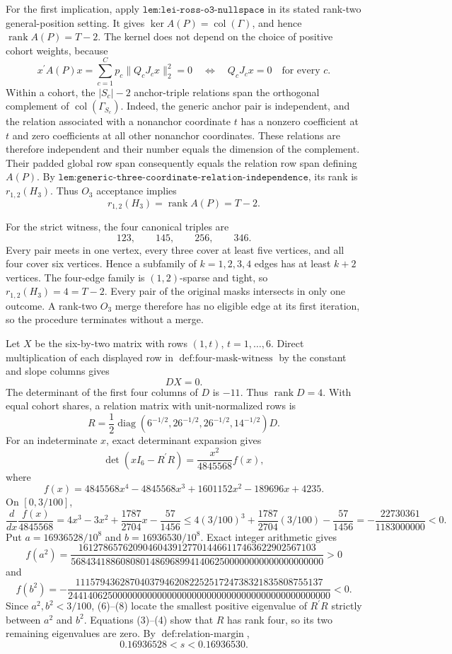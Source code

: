 For the first implication, apply \(\texttt{lem:lei-ross-o3-nullspace}\) in its stated rank-two general-position setting. It gives \(\ker A(P)=\operatorname{col}(\Gamma)\), and hence \(\operatorname{rank}A(P)=T-2\). The kernel does not depend on the choice of positive cohort weights, because
\[
x^{\prime}A(P)x
=\sum_{c=1}^Cp_c\|Q_cJ_cx\|_2^2=0
\quad\Longleftrightarrow\quad
Q_cJ_cx=0\quad\text{for every }c.
\tag{1}
\]
Within a cohort, the \(|S_c|-2\) anchor-triple relations span the orthogonal complement of \(\operatorname{col}(\Gamma_{S_c})\). Indeed, the generic anchor pair is independent, and the relation associated with a nonanchor coordinate \(t\) has a nonzero coefficient at \(t\) and zero coefficients at all other nonanchor coordinates. These relations are therefore independent and their number equals the dimension of the complement. Their padded global row span consequently equals the relation row span defining \(A(P)\). By \(\texttt{lem:generic-three-coordinate-relation-independence}\), its rank is \(r_{1,2}(H_3)\). Thus \(O_3\) acceptance implies
\[
r_{1,2}(H_3)=\operatorname{rank}A(P)=T-2.
\tag{2}
\]

For the strict witness, the four canonical triples are
\[
123,\qquad145,\qquad256,\qquad346.
\]
Every pair meets in one vertex, every three cover at least five vertices, and all four cover six vertices. Hence a subfamily of \(k=1,2,3,4\) edges has at least \(k+2\) vertices. The four-edge family is \((1,2)\)-sparse and tight, so \(r_{1,2}(H_3)=4=T-2\). Every pair of the original masks intersects in only one outcome. A rank-two \(O_3\) merge therefore has no eligible edge at its first iteration, so the procedure terminates without a merge.

Let \(X\) be the six-by-two matrix with rows \((1,t)\), \(t=1,\ldots,6\). Direct multiplication of each displayed row in \(\operatorname{def:four\text{-}mask\text{-}witness}\) by the constant and slope columns gives
\[
DX=0.
\tag{3}
\]
The determinant of the first four columns of \(D\) is \(-11\). Thus \(\operatorname{rank}D=4\). With equal cohort shares, a relation matrix with unit-normalized rows is
\[
R=\frac12\operatorname{diag}(6^{-1/2},26^{-1/2},26^{-1/2},14^{-1/2})D.
\tag{4}
\]
For an indeterminate \(x\), exact determinant expansion gives
\[
\det(xI_6-R^{\prime}R)=\frac{x^2}{4845568}f(x),
\]
where
\[
f(x)=4845568x^4-4845568x^3+1601152x^2-189696x+4235.
\tag{5}
\]
On \([0,3/100]\),
\[
\frac{d}{dx}\frac{f(x)}{4845568}
=4x^3-3x^2+\frac{1787}{2704}x-\frac{57}{1456}
\leq4(3/100)^3+\frac{1787}{2704}(3/100)-\frac{57}{1456}
=-\frac{22730361}{1183000000}<0.
\tag{6}
\]
Put \(a=16936528/10^8\) and \(b=16936530/10^8\). Exact integer arithmetic gives
\[
f(a^2)=
\frac{161278657620904604391277014466117463622902567103}
{568434188608080148696899414062500000000000000000000}>0
\tag{7}
\]
and
\[
f(b^2)=
-\frac{11157943628704037946208225251724738321835808755137}
{24414062500000000000000000000000000000000000000000000}<0.
\tag{8}
\]
Since \(a^2,b^2<3/100\), (6)--(8) locate the smallest positive eigenvalue of \(R^{\prime}R\) strictly between \(a^2\) and \(b^2\). Equations (3)--(4) show that \(R\) has rank four, so its two remaining eigenvalues are zero. By \(\operatorname{def:relation\text{-}margin}\),
\[
0.16936528<s<0.16936530.
\tag{9}
\]

